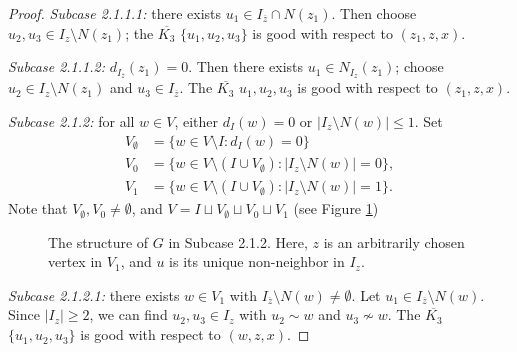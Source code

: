 \documentclass{article}
\newcommand\sm{\setminus}
\theoremstyle{definition}
\begin{document}
\begin{proof}
    \textit{Subcase 2.1.1.1:} there exists $u_1\in I_{\overline z}\cap N(z_1)$. Then choose $u_2,u_3\in I_z\sm N(z_1)$; the $\overline{K_3}$ $\{u_1,u_2,u_3\}$ is good with respect to $(z_1,z,x)$.

    \textit{Subcase 2.1.1.2:} $d_{I_{\overline{z}}}(z_1)=0$. Then there exists $u_1\in N_{I_z}(z_1)$; choose $u_2\in I_z\sm N(z_1)$ and $u_3\in I_{\overline z}$. The $\overline{K_3}$ $u_1,u_2,u_3$ is good with respect to $(z_1,z,x)$.

    \textit{Subcase 2.1.2:} for all $w\in V$, either $d_I(w)=0$ or $|I_z\sm N(w)|\le 1$. Set
    $$\begin{aligned}
        V_\emptyset&=\{w\in V\sm I:d_I(w)=0\}\\
        V_{0}&=\{w\in V\sm (I\cup V_{\emptyset}):|I_z\sm N(w)|=0\},\\
        V_1&=\{w\in V\sm(I\cup V_{\emptyset}):|I_z\sm N(w)|=1\}.
    \end{aligned}$$
    Note that $V_\emptyset,V_0\ne\emptyset$, and $V=I\sqcup V_\emptyset\sqcup V_0\sqcup V_1$ (see Figure \ref{Figure Subcase 2.1.2})

\begin{figure}
    \begin{center}
\caption{The structure of $G$ in Subcase 2.1.2. Here, $z$ is an arbitrarily chosen vertex in $V_1$, and $u$ is its unique non-neighbor in $I_z$.} \label{Figure Subcase 2.1.2}
\end{center}
\end{figure}

    \textit{Subcase 2.1.2.1:} there exists $w\in V_1$ with $I_{\overline z}\sm N(w)\ne\emptyset$. Let $u_1\in I_{\overline z}\sm N(w)$. Since $|I_z|\ge 2$, we can find $u_2,u_3\in I_z$ with $u_2\sim w$ and $u_3\not\sim w$. The $\overline{K_3}$ $\{u_1,u_2,u_3\}$ is good with respect to $(w,z,x)$.


\end{proof}
\end{document}

